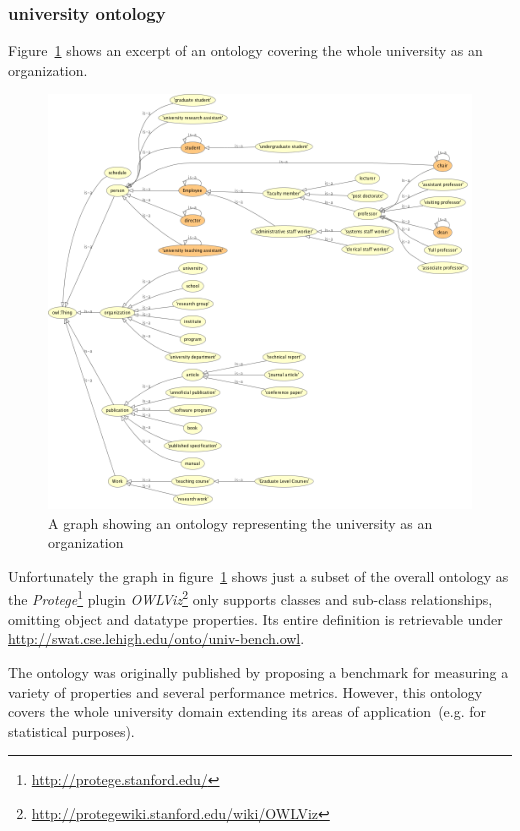 \documentclass{article}
\begin{document}
\subsubsection{university ontology}
Figure~\ref{fig:owl-univ1} shows an excerpt of an ontology covering the whole university as an organization.
\begin{figure}[H]
	\centering \includegraphics*[width=.8\columnwidth]{owl-univ1.png}
	\caption{A graph showing an ontology representing the university as an organization}
	\label{fig:owl-univ1}
\end{figure}
Unfortunately the graph in figure~\ref{fig:owl-univ1} shows just a subset of the overall ontology as the \textit{Protege}\footnote{\url{http://protege.stanford.edu/}} plugin \textit{OWLViz}\footnote{\url{http://protegewiki.stanford.edu/wiki/OWLViz}} only supports classes and sub-class relationships, omitting object and datatype properties. Its entire definition is retrievable under \url{http://swat.cse.lehigh.edu/onto/univ-bench.owl}. 

The ontology was originally published by \citet{article:university-ontology} proposing a benchmark for measuring a variety of properties and several performance
metrics. However, this ontology covers the whole university domain extending its areas of application~(e.g. for statistical purposes). 
\end{document}
